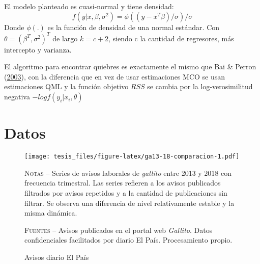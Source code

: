 \documentclass[12pt,oneside]{reedthesis}
\makeatletter
\def\maxwidth{ %
  \ifdim\Gin@nat@width>\linewidth
    \linewidth
  \else
    \Gin@nat@width
  \fi
}
\makeatother
\begin{document}
El modelo planteado es cuasi-normal y tiene densidad:
\[
f(y|x,\beta, \sigma^2) = \phi((y-x^T\beta)/\sigma)/\sigma
\]
Donde \(\phi(.)\) es la función de densidad de una normal estándar. Con \(\theta = (\beta^T, \sigma^2)^T\) de largo \(k = c +2\), siendo c la cantidad de regresores, más intercepto y varianza.

El algoritmo para encontrar quiebres es exactamente el mismo que Bai \& Perron (\protect\hyperlink{ref-BaiPerron2003}{2003}), con la diferencia que en vez de usar estimaciones MCO se usan estimaciones QML y la función objetivo \(RSS\) se cambia por la log-verosimilitud negativa \(-logf(y_i|x_i, \theta)\)

\newpage

\hypertarget{datos}{%
\section{Datos}\label{datos}}
\begin{figure}
\texttt{[image: tesis\_files/figure-latex/ga13-18-comparacion-1.pdf]}
\caption{Avisos diario El País}\label{fig:ga13-18-comparacion}\textsc{}

\footnotesize\textsc{Notas} -- Series de avisos laborales de \textit{gallito} entre 2013 y 2018 con frecuencia trimestral. Las series refieren a los avisos publicados filtrados por avisos repetidos y a la cantidad de publicaciones sin filtrar. Se observa una diferencia de nivel relativamente estable y la misma dinámica.

\textsc{Fuentes} -- Avisos publicados en el portal web \textit{Gallito}. Datos confidenciales facilitados por diario El País. Procesamiento propio.
\end{figure}
\end{document}
